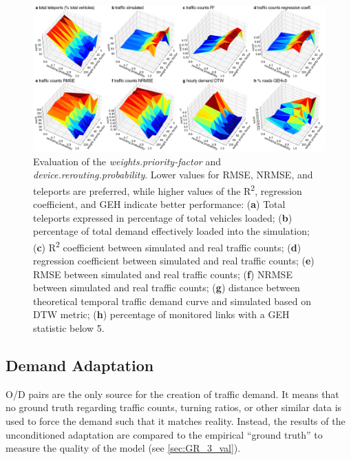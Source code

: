 \begin{figure}[htbp!]
    \centering
    \includegraphics[width=1\textwidth]{fig05 copy.png}
    \caption{Evaluation of the \emph{weights.priority-factor} and \emph{device.rerouting.probability}. Lower values for RMSE, NRMSE, and teleports are preferred, while higher values of the R\textsuperscript{2}, regression coefficient, and GEH indicate better performance: (\textbf{a}) Total teleports expressed in percentage of total vehicles loaded; (\textbf{b}) percentage of total demand effectively loaded into the simulation; (\textbf{c}) R\textsuperscript{2} coefficient between simulated and real traffic counts; (\textbf{d}) regression coefficient between simulated and real traffic counts; (\textbf{e}) RMSE between simulated and real traffic counts; (\textbf{f}) NRMSE between simulated and real traffic counts; (\textbf{g}) distance between theoretical temporal traffic demand curve and simulated based on DTW metric; (\textbf{h}) percentage of monitored links with a GEH statistic below 5.}
   \label{fig:getting_real_05_eval}
\end{figure}

\subsection{Demand Adaptation}
\label{subsec:GR_2.5_demand_adapt}

O/D pairs are the only source for the creation of traffic demand. It means that no ground truth regarding traffic counts, turning ratios, or other similar data is used to force the demand such that it matches reality. Instead, the results of the unconditioned adaptation are compared to the empirical “ground truth” to measure the quality of the model (see \autoref{sec:GR_3_val}).

